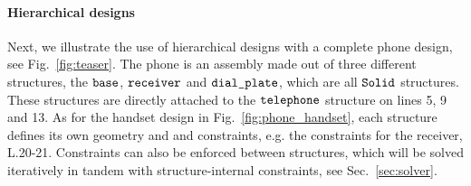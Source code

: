 \paragraph{Hierarchical designs}
Next, we illustrate the use of hierarchical designs with a complete phone design, see Fig.~\ref{fig:teaser}.
The phone is an assembly made out of three different structures, the $\verb|base|$, $\verb|receiver|$ and $\verb|dial_plate|$, which are all $\verb|Solid|$ structures.
These structures are directly attached to the $\verb|telephone|$ structure on lines 5, 9 and 13.
As for the handset design in Fig.~\ref{fig:phone_handset}, each structure defines its own geometry and and constraints, e.g. the constraints for the receiver, L.20-21.
Constraints can also be enforced between structures, which will be solved iteratively in tandem with structure-internal constraints, see Sec.~\ref{sec:solver}.

%

